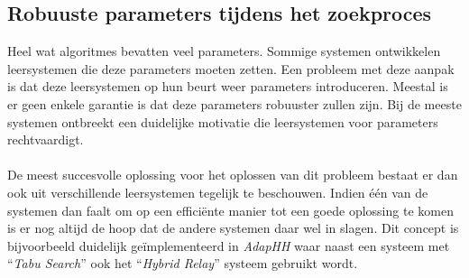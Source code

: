 \subsection{Robuuste parameters tijdens het zoekproces}
Heel wat algoritmes bevatten veel parameters. Sommige systemen ontwikkelen leersystemen die deze parameters moeten zetten. Een probleem met deze aanpak is dat deze leersystemen op hun beurt weer parameters introduceren. Meestal is er geen enkele garantie is dat deze parameters robuuster zullen zijn. Bij de meeste systemen ontbreekt een duidelijke motivatie die leersystemen voor parameters rechtvaardigt.
\paragraph{}
De meest succesvolle oplossing voor het oplossen van dit probleem bestaat er dan ook uit verschillende leersystemen tegelijk te beschouwen. Indien \'e\'en van de systemen dan faalt om op een effici\"ente manier tot een goede oplossing te komen is er nog altijd de hoop dat de andere systemen daar wel in slagen. Dit concept is bijvoorbeeld duidelijk ge\"implementeerd in \emph{AdapHH} waar naast een systeem met ``\emph{Tabu Search}'' ook het ``\emph{Hybrid Relay}'' systeem gebruikt wordt.

